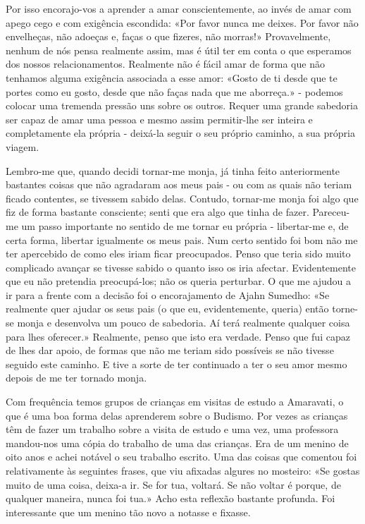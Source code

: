 Por isso encorajo-vos a aprender a amar conscientemente, ao invés de
amar com apego cego e com exigência escondida: «Por favor nunca me
deixes. Por favor não envelheças, não adoeças e, faças o que fizeres,
não morras!» Provavelmente, nenhum de nós pensa realmente assim, mas é
útil ter em conta o que esperamos dos nossos relacionamentos. Realmente
não é fácil amar de forma que não tenhamos alguma exigência associada a
esse amor: «Gosto de ti desde que te portes como eu gosto, desde que não
faças nada que me aborreça.» - podemos colocar uma tremenda pressão uns
sobre os outros. Requer uma grande sabedoria ser capaz de amar uma
pessoa e mesmo assim \mbox{permitir-lhe} ser inteira e completamente ela
própria - deixá-la seguir o seu próprio caminho, a sua própria viagem.

Lembro-me que, quando decidi tornar-me monja, já tinha feito
anteriormente bastantes coisas que não agradaram aos meus pais - ou com
as quais não teriam ficado contentes, se tivessem sabido delas. Contudo,
tornar-me monja foi algo que fiz de forma bastante consciente; senti que
era algo que tinha de fazer. Pareceu-me um passo importante no sentido
de me tornar eu própria - libertar-me e, de certa forma, libertar
igualmente os meus pais. Num certo sentido foi bom não me ter apercebido
de como eles iriam ficar preocupados. Penso que teria sido muito
complicado avançar se tivesse sabido o quanto isso os iria afectar.
Evidentemente que eu não pretendia preocupá-los; não os queria
perturbar. O que me ajudou a ir para a frente com a decisão foi o
encorajamento de Ajahn Sumedho: «Se realmente quer ajudar os seus pais
(o que eu, evidentemente, queria) então torne-se monja e desenvolva um
pouco de sabedoria. Aí terá realmente qualquer coisa para lhes
oferecer.» Realmente, penso que isto era verdade. Penso que fui capaz de
lhes dar apoio, de formas que não me teriam sido possíveis se não
tivesse seguido este caminho. E tive a sorte de ter continuado a ter o
seu amor mesmo depois de me ter tornado monja.

Com frequência temos grupos de crianças em visitas de estudo a
Amaravati, o que é uma boa forma delas aprenderem sobre o Budismo. Por
vezes as crianças têm de fazer um trabalho sobre a visita de estudo e
uma vez, uma professora mandou-nos uma cópia do trabalho de uma das
crianças. Era de um menino de oito anos e achei notável o seu trabalho
escrito. Uma das coisas que comentou foi relativamente às seguintes
frases, que viu afixadas algures no mosteiro: «Se gostas muito de uma
coisa, deixa-a ir. Se for tua, voltará. Se não voltar é porque, de
qualquer maneira, nunca foi tua.» Acho esta reflexão bastante profunda.
Foi interessante que um menino tão novo a notasse e fixasse.


